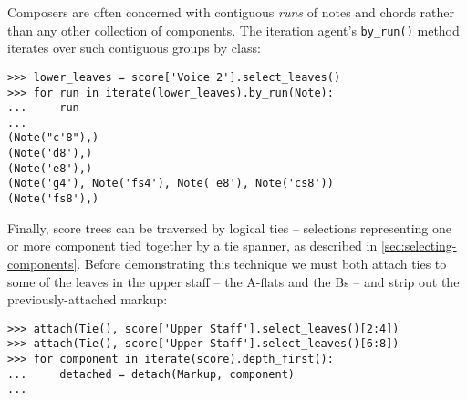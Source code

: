 \noindent Composers are often concerned with contiguous \emph{runs} of notes
and chords rather than any other collection of components. The iteration
agent's \texttt{by\_run()} method iterates over such contiguous groups by
class:

\begin{comment}
<abjad>
lower_leaves = score['Voice 2'].select_leaves()
for run in iterate(lower_leaves).by_run(Note):
    run

</abjad>
\end{comment}

\begin{abjadbookoutput}
\begin{singlespacing}
\vspace{-0.5\baselineskip}
\begin{verbatim}
>>> lower_leaves = score['Voice 2'].select_leaves()
>>> for run in iterate(lower_leaves).by_run(Note):
...     run
...
(Note("c'8"),)
(Note('d8'),)
(Note('e8'),)
(Note('g4'), Note('fs4'), Note('e8'), Note('cs8'))
(Note('fs8'),)
\end{verbatim}
\end{singlespacing}
\end{abjadbookoutput}

\noindent Finally, score trees can be traversed by logical ties -- selections
representing one or more component tied together by a tie spanner, as described
in \autoref{sec:selecting-components}. Before demonstrating this technique we
must both attach ties to some of the leaves in the upper staff -- the A-flats
and the Bs -- and strip out the previously-attached markup:

\begin{comment}
<abjad>
attach(Tie(), score['Upper Staff'].select_leaves()[2:4])
attach(Tie(), score['Upper Staff'].select_leaves()[6:8])
for component in iterate(score).depth_first():
    detached = detach(Markup, component)

</abjad>
\end{comment}

\begin{abjadbookoutput}
\begin{singlespacing}
\vspace{-0.5\baselineskip}
\begin{verbatim}
>>> attach(Tie(), score['Upper Staff'].select_leaves()[2:4])
>>> attach(Tie(), score['Upper Staff'].select_leaves()[6:8])
>>> for component in iterate(score).depth_first():
...     detached = detach(Markup, component)
...
\end{verbatim}
\end{singlespacing}
\end{abjadbookoutput}

